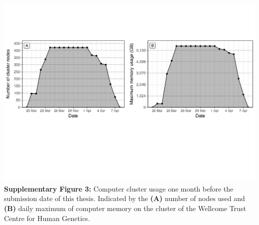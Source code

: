 \documentclass[a4paper,twoside]{dphilthesis}
\begin{document}
\begin{flushleft}
\includegraphics[width=\textwidth]{./img/stat_clusterload}
\vspace*{-5ex}
\small\singlespacing\textbf{Supplementary Figure 3:} Computer cluster usage one month before the submission date of this thesis. Indicated by the \textbf{(A)} number of nodes used and \textbf{(B)} daily maximum of computer memory on the cluster of the Wellcome Trust Centre for Human Genetics.
\end{flushleft}



\cleardoublepage
\thispagestyle{empty}



\end{document}
